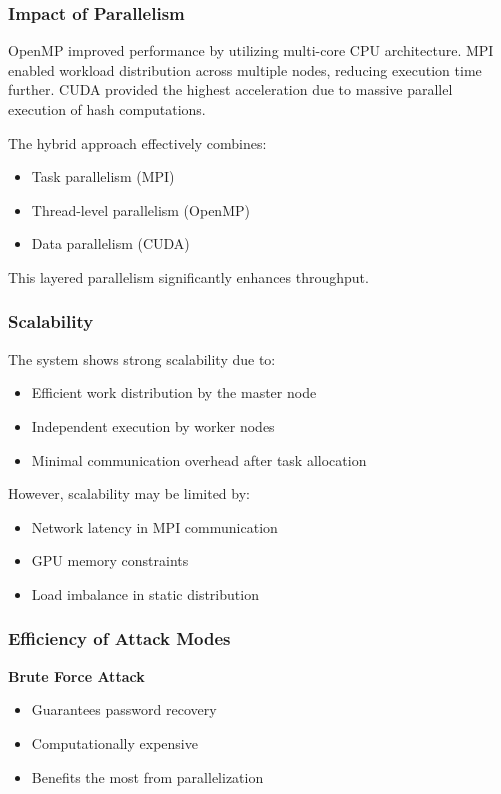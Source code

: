 \documentclass[12pt,a4paper]{article}
\begin{document}
\subsubsection{Impact of Parallelism}

OpenMP improved performance by utilizing multi-core CPU architecture. MPI enabled workload distribution across multiple nodes, reducing execution time further. CUDA provided the highest acceleration due to massive parallel execution of hash computations.

The hybrid approach effectively combines:
\begin{itemize}
\item Task parallelism (MPI)
\item Thread-level parallelism (OpenMP)
\item Data parallelism (CUDA)
\end{itemize}

This layered parallelism significantly enhances throughput.

\subsubsection{Scalability}

The system shows strong scalability due to:
\begin{itemize}
\item Efficient work distribution by the master node
\item Independent execution by worker nodes
\item Minimal communication overhead after task allocation
\end{itemize}

However, scalability may be limited by:
\begin{itemize}
\item Network latency in MPI communication
\item GPU memory constraints
\item Load imbalance in static distribution
\end{itemize}

\subsubsection{Efficiency of Attack Modes}

\textbf{Brute Force Attack}
\begin{itemize}
\item Guarantees password recovery
\item Computationally expensive
\item Benefits the most from parallelization
\end{itemize}
\end{document}
